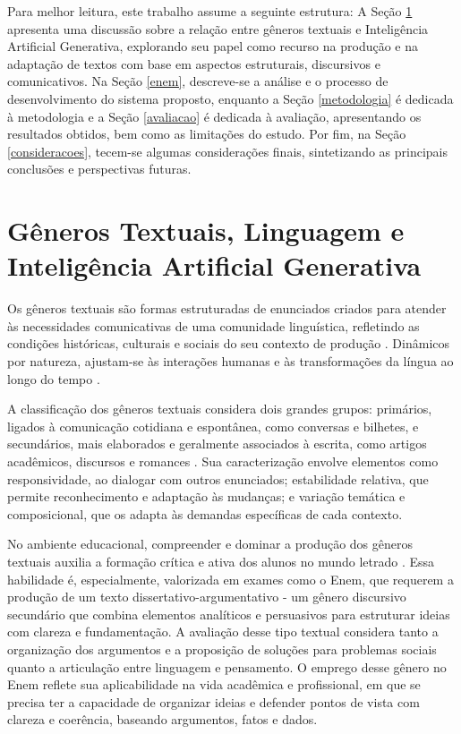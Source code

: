 \documentclass[portuguese]{textolivre}
\begin{document}
Para melhor leitura, este trabalho assume a seguinte estrutura: A Seção \ref{generos} apresenta uma discussão sobre a relação entre gêneros textuais e Inteligência Artificial Generativa, explorando seu papel como recurso na produção e na adaptação de textos com base em aspectos estruturais, discursivos e comunicativos. Na Seção \ref{enem}, descreve-se a análise e o processo de desenvolvimento do sistema proposto, enquanto a Seção \ref{metodologia} é dedicada à metodologia e a Seção \ref{avaliacao} é dedicada à avaliação, apresentando os resultados obtidos, bem como as limitações do estudo. Por fim, na Seção \ref{consideracoes}, tecem-se algumas considerações finais, sintetizando as principais conclusões e perspectivas futuras.

\section{Gêneros Textuais, Linguagem e Inteligência Artificial Generativa}\label{generos}

Os gêneros textuais são formas estruturadas de enunciados criados para atender às necessidades comunicativas de uma comunidade linguística, refletindo as condições históricas, culturais e sociais do seu contexto de produção \cite{silva2024generos}. Dinâmicos por natureza, ajustam-se às interações humanas e às transformações da língua ao longo do tempo \cite{gomes2018generos}.

A classificação dos gêneros textuais considera dois grandes grupos: primários, ligados à comunicação cotidiana e espontânea, como conversas e bilhetes, e secundários, mais elaborados e geralmente associados à escrita, como artigos acadêmicos, discursos e romances \cite{bakhtin1997generos}. Sua caracterização envolve elementos como responsividade, ao dialogar com outros enunciados; estabilidade relativa, que permite reconhecimento e adaptação às mudanças; e variação temática e composicional, que os adapta às demandas específicas de cada contexto.

No ambiente educacional, compreender e dominar a produção dos gêneros textuais auxilia a formação crítica e ativa dos alunos no mundo letrado \cite{silva2024generos}. Essa habilidade é, especialmente, valorizada em exames como o Enem, que requerem a produção de um texto dissertativo-argumentativo - um gênero discursivo secundário que combina elementos analíticos e persuasivos para estruturar ideias com clareza e fundamentação. A avaliação desse tipo textual considera tanto a organização dos argumentos e a proposição de soluções para problemas sociais quanto a articulação entre linguagem e pensamento. O emprego desse gênero no Enem reflete sua aplicabilidade na vida acadêmica e profissional, em que se precisa ter a capacidade de organizar ideias e defender pontos de vista com clareza e coerência, baseando argumentos, fatos e dados. 
\end{document}
